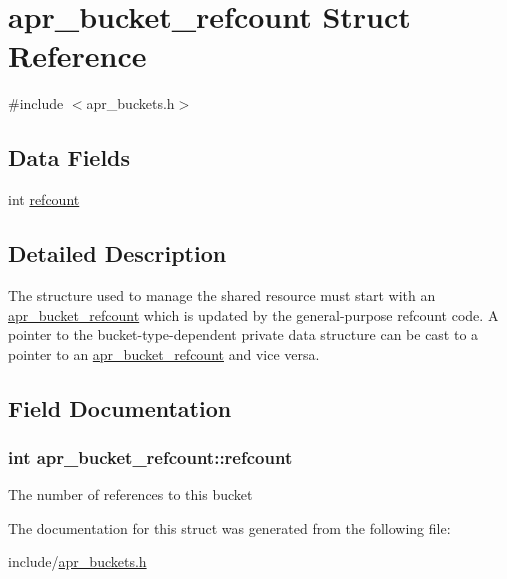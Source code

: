 \hypertarget{structapr__bucket__refcount}{\section{apr\-\_\-bucket\-\_\-refcount Struct Reference}
\label{structapr__bucket__refcount}
}


{\ttfamily \#include $<$apr\-\_\-buckets.\-h$>$}

\subsection*{Data Fields}
\begin{DoxyCompactItemize}
\item 
int \hyperlink{structapr__bucket__refcount_a75040af03e3ad3c722bccea1048e3dae}{refcount}
\end{DoxyCompactItemize}


\subsection{Detailed Description}
The structure used to manage the shared resource must start with an \hyperlink{structapr__bucket__refcount}{apr\-\_\-bucket\-\_\-refcount} which is updated by the general-\/purpose refcount code. A pointer to the bucket-\/type-\/dependent private data structure can be cast to a pointer to an \hyperlink{structapr__bucket__refcount}{apr\-\_\-bucket\-\_\-refcount} and vice versa. 

\subsection{Field Documentation}
\hypertarget{structapr__bucket__refcount_a75040af03e3ad3c722bccea1048e3dae}{
\subsubsection[{refcount}]{\setlength{\rightskip}{0pt plus 5cm}int apr\-\_\-bucket\-\_\-refcount\-::refcount}}\label{structapr__bucket__refcount_a75040af03e3ad3c722bccea1048e3dae}
The number of references to this bucket 

The documentation for this struct was generated from the following file\-:\begin{DoxyCompactItemize}
\item 
include/\hyperlink{apr__buckets_8h}{apr\-\_\-buckets.\-h}\end{DoxyCompactItemize}

